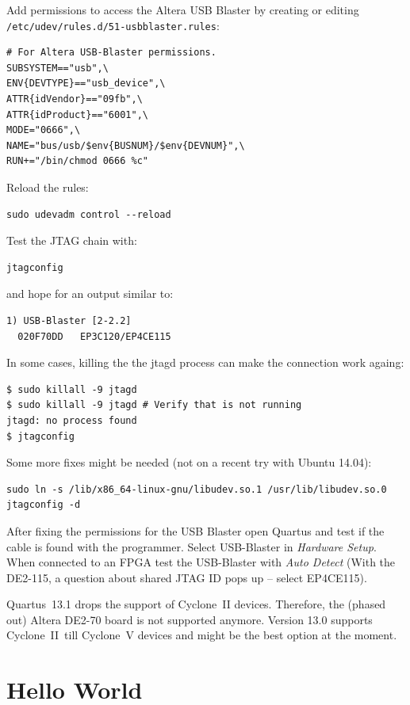 \documentclass[a4paper,fontsize=10pt,twoside,DIV15,BCOR12mm,headinclude=true,footinclude=false,pagesize,bibtotoc]{scrbook}
\newcommand{\code}[1]{{\texttt{#1}}}
\begin{document}
Add permissions to access the Altera USB Blaster by creating or editing \code{/etc/udev/rules.d/51-usbblaster.rules}:

\begin{verbatim}
# For Altera USB-Blaster permissions.
SUBSYSTEM=="usb",\
ENV{DEVTYPE}=="usb_device",\
ATTR{idVendor}=="09fb",\
ATTR{idProduct}=="6001",\
MODE="0666",\
NAME="bus/usb/$env{BUSNUM}/$env{DEVNUM}",\
RUN+="/bin/chmod 0666 %c"
\end{verbatim}

Reload the rules:
\begin{verbatim}
sudo udevadm control --reload
\end{verbatim}

Test the JTAG chain with:
\begin{verbatim}
jtagconfig
\end{verbatim}

and hope for an output similar to:

\begin{verbatim}
1) USB-Blaster [2-2.2]
  020F70DD   EP3C120/EP4CE115
\end{verbatim}

In some cases, killing the the jtagd process can make the connection work againg:

\begin{verbatim}
$ sudo killall -9 jtagd
$ sudo killall -9 jtagd # Verify that is not running
jtagd: no process found
$ jtagconfig
\end{verbatim}

Some more fixes might be needed (not on a recent try with Ubuntu 14.04):

\begin{verbatim}
sudo ln -s /lib/x86_64-linux-gnu/libudev.so.1 /usr/lib/libudev.so.0
jtagconfig -d
\end{verbatim}


After fixing the permissions for the USB Blaster open Quartus and test if the
cable is found with the programmer. Select USB-Blaster in \emph{Hardware Setup}.
When connected to an FPGA test the USB-Blaster with \emph{Auto Detect}
(With the DE2-115, a question about shared JTAG ID pops up -- select EP4CE115).

Quartus~13.1 drops the support of Cyclone~II devices. Therefore, the
(phased out) Altera DE2-70 board is not supported anymore. Version 13.0 supports Cyclone~II\
till Cyclone~V devices and might be the best option at the moment.


\section{Hello World}
\end{document}
